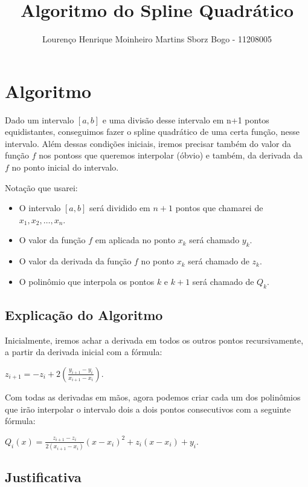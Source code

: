 \documentclass[12pt]{article}
\title{Algoritmo do Spline Quadrático}
\author{Lourenço Henrique Moinheiro Martins Sborz Bogo - 11208005}
\date{}
\begin{document}
\maketitle

\section{Algoritmo}

Dado um intervalo $[a,b]$ e uma divisão desse intervalo em n+1 pontos equidistantes, conseguimos fazer o spline quadrático de uma certa função, nesse intervalo. Além dessas condições iniciais, iremos precisar também do valor da função $f$ nos pontoss que queremos interpolar (óbvio) e também, da derivada da $f$ no ponto inicial do intervalo.

Notação que usarei:

\begin{itemize}
  
\item O intervalo $[a,b]$ será dividido em $n+1$ pontos que chamarei de $x_1, x_2, \dots, x_n$.
  
\item O valor da função $f$ em aplicada no ponto $x_k$ será chamado $y_k$.
  
\item O valor da derivada da função $f$ no ponto $x_k$ será chamado de $z_k$.
  
\item O polinômio que interpola os pontos $k$ e $k+1$ será chamado de $Q_k$.
  
\end{itemize}

\subsection{Explicação do Algoritmo}

Inicialmente, iremos achar a derivada em todos os outros pontos recursivamente, a partir da derivada inicial com a fórmula:

$z_{i+1} = -z_i + 2(\frac{y_{i+1}-y_i}{x_{i+1}-x_i})$.

Com todas as derivadas em mãos, agora podemos criar cada um dos polinômios que irão interpolar o intervalo dois a dois pontos consecutivos com a seguinte fórmula:

$Q_i(x) = \frac{z_{i+1}-z_{i}}{2(x_{i+1}-x_i)}(x-x_i)^2+z_i(x-x_i)+y_i$.

\subsection{Justificativa}
\end{document}
